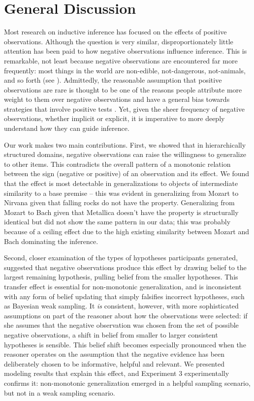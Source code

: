 \documentclass[authoryear,11pt]{elsarticle}
\begin{document}
\section{General Discussion}

Most research on inductive inference has focused on the effects of positive observations. Although the question is very similar, disproportionately little attention has been paid to how negative observations influence inference. This is remarkable, not least because negative observations are encountered far more frequently: most things in the world are non-edible, not-dangerous, not-animals, and so forth (see \citealt{KalishLawson2007}). Admittedly, the reasonable assumption that positive observations are rare is thought to be one of the reasons people attribute more weight to them over negative observations  \citep{McKenzieMikkelsen2007} and have a general bias towards strategies that involve positive tests \citep[e.g.][]{NavarroPerfors2011, OaksfordChater1994}. Yet, given the sheer frequency of negative observations, whether implicit or explicit, it is imperative to more deeply understand how they can guide inference.

Our work makes two main contributions. First, we showed that in hierarchically structured domains, negative observations can raise the willingness to generalize to other items. This contradicts the overall pattern of a monotonic relation between the sign (negative or positive) of an observation and its effect. We found that the effect is most detectable in generalizations to objects of intermediate similarity to a base premise -- this was evident in generalizing from Mozart to Nirvana given that falling rocks do not have the property. Generalizing from Mozart to Bach given that Metallica doesn't have the property is structurally identical but did not show the same pattern in our data; this was probably because of a ceiling effect due to the high existing similarity between Mozart and Bach dominating the inference.

Second, closer examination of the types of hypotheses participants generated, suggested that negative observations produce this effect by drawing belief to the largest remaining hypothesis, pulling belief from the smaller hypotheses. This transfer effect is essential for non-monotonic generalization, and is inconsistent with any form of belief updating that simply falsifies incorrect hypotheses, such as Bayesian weak sampling. It {\it is} consistent, however, with more sophisticated assumptions on part of the reasoner about how the observations were selected: if she assumes that the negative observation was chosen from the set of possible negative observations, a shift in belief from smaller to larger consistent hypotheses is sensible. This belief shift becomes especially pronounced when the reasoner operates on the assumption that the negative evidence has been deliberately chosen to be informative, helpful and relevant. We presented modeling results that explain this effect, and Experiment 3 experimentally confirms it: non-monotonic generalization emerged in a helpful sampling scenario, but not in a weak sampling scenario.
\end{document}
